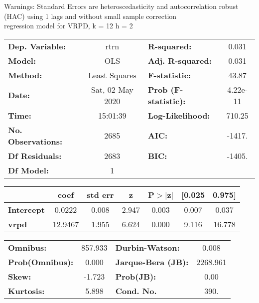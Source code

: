 Warnings: \newline
 [1] Standard Errors are heteroscedasticity and autocorrelation robust (HAC) using 1 lags and without small sample correction\\ 

regression model for VRPD, k = 12 h = 2\begin{center}
\begin{tabular}{lclc}
\toprule
\textbf{Dep. Variable:}    &       rtrn       & \textbf{  R-squared:         } &     0.031   \\
\textbf{Model:}            &       OLS        & \textbf{  Adj. R-squared:    } &     0.031   \\
\textbf{Method:}           &  Least Squares   & \textbf{  F-statistic:       } &     43.87   \\
\textbf{Date:}             & Sat, 02 May 2020 & \textbf{  Prob (F-statistic):} &  4.22e-11   \\
\textbf{Time:}             &     15:01:39     & \textbf{  Log-Likelihood:    } &    710.25   \\
\textbf{No. Observations:} &        2685      & \textbf{  AIC:               } &    -1417.   \\
\textbf{Df Residuals:}     &        2683      & \textbf{  BIC:               } &    -1405.   \\
\textbf{Df Model:}         &           1      & \textbf{                     } &             \\
\bottomrule
\end{tabular}
\begin{tabular}{lcccccc}
                   & \textbf{coef} & \textbf{std err} & \textbf{z} & \textbf{P$> |$z$|$} & \textbf{[0.025} & \textbf{0.975]}  \\
\midrule
\textbf{Intercept} &       0.0222  &        0.008     &     2.947  &         0.003        &        0.007    &        0.037     \\
\textbf{vrpd}      &      12.9467  &        1.955     &     6.624  &         0.000        &        9.116    &       16.778     \\
\bottomrule
\end{tabular}
\begin{tabular}{lclc}
\textbf{Omnibus:}       & 857.933 & \textbf{  Durbin-Watson:     } &    0.008  \\
\textbf{Prob(Omnibus):} &   0.000 & \textbf{  Jarque-Bera (JB):  } & 2268.961  \\
\textbf{Skew:}          &  -1.723 & \textbf{  Prob(JB):          } &     0.00  \\
\textbf{Kurtosis:}      &   5.898 & \textbf{  Cond. No.          } &     390.  \\
\bottomrule
\end{tabular}
\end{center}

